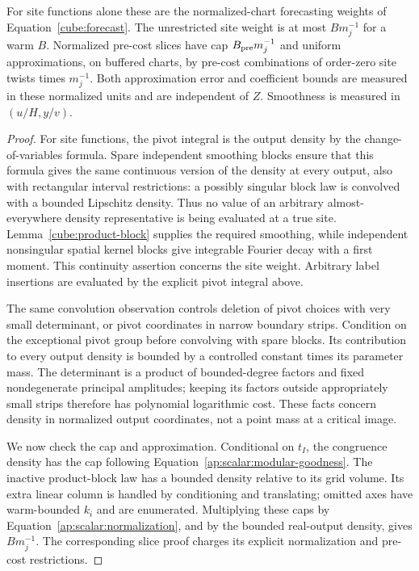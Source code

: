 \begin{lemma}
\label{ap:scalar:measure}
For site functions alone these are the normalized-chart forecasting
weights of Equation~\eqref{cube:forecast}. The unrestricted site
weight is at most $B m_j^{-1}$ for a warm $B$. Normalized pre-cost
slices have cap $B_{\rm pre}m_j^{-1}$ and uniform approximations, on
buffered charts, by pre-cost combinations of order-zero site twists
times $m_j^{-1}$. Both approximation error and coefficient bounds
are measured in these normalized units and are independent of $Z$.
Smoothness is measured in $(u/H,y/v)$.
\end{lemma}

\begin{proof}
For site functions, the pivot integral is the output density by the
change-of-variables formula. Spare
independent smoothing blocks ensure that this formula gives the same
continuous version of the density at every output, also with
rectangular interval restrictions: a possibly singular block law is
convolved with a bounded Lipschitz density. Thus no value of an
arbitrary almost-everywhere density representative is being evaluated
at a true site. Lemma~\ref{cube:product-block} supplies the required
smoothing, while independent nonsingular spatial kernel blocks give
integrable Fourier decay with a first moment.
This continuity assertion concerns the site weight. Arbitrary label
insertions are evaluated by the explicit pivot integral above.

The same convolution observation controls deletion of pivot choices
with very small determinant, or pivot coordinates in narrow boundary
strips. Condition on the exceptional pivot group before convolving
with spare blocks. Its contribution to every output density is bounded
by a controlled constant times its parameter mass. The determinant is
a product of bounded-degree factors and fixed nondegenerate principal
amplitudes; keeping its factors outside appropriately small strips
therefore has polynomial logarithmic cost. These facts concern density
in normalized output coordinates, not a point mass at a critical
image.

We now check the cap and approximation. Conditional on $t_I$, the
congruence density has the cap following
Equation~\eqref{ap:scalar:modular-goodness}. The inactive product-block
law has a bounded density relative to its grid volume. Its extra
linear column is handled by conditioning and translating; omitted
axes have warm-bounded $k_i$ and are enumerated. Multiplying these
caps by Equation~\eqref{ap:scalar:normalization}, and by the bounded
real-output density, gives $B m_j^{-1}$. The corresponding slice
proof charges its explicit normalization and pre-cost restrictions.


\end{proof}
